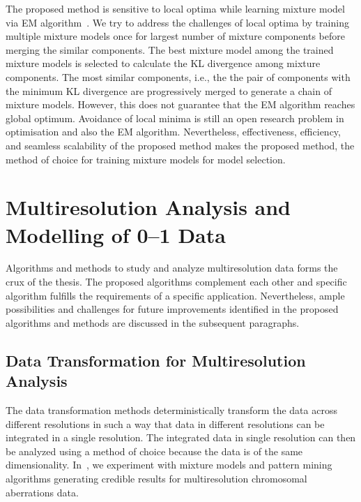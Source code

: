 The proposed method is sensitive to local optima while  learning 
mixture model via EM algorithm~\cite{McLachlan2008emext,wu1983}.
We try to address the challenges of local optima by training 
multiple mixture models once for largest number of mixture 
components before merging the similar components. The best 
mixture model among the trained mixture models is selected to 
calculate the KL divergence among mixture components. The most 
similar components, i.e., the the pair of components with the 
minimum KL divergence are progressively merged to generate a 
chain of mixture models. However, this does not guarantee that the 
EM algorithm reaches global optimum. Avoidance of local 
minima is still an open research problem in optimisation and
also the EM algorithm. Nevertheless, effectiveness, efficiency, 
and seamless scalability of the proposed method makes the 
proposed method, the method of choice for training mixture 
models for model selection.



\section{Multiresolution Analysis and Modelling of 0--1 Data}
\label{s:dmultires}

Algorithms and methods to study and analyze multiresolution
data forms the crux of the thesis. The proposed algorithms 
complement each other and specific algorithm fulfills the 
requirements of a specific application. Nevertheless, 
ample possibilities and challenges for future improvements 
identified in the proposed algorithms and methods are discussed
in the subsequent paragraphs.

\subsection{Data Transformation for Multiresolution Analysis}
\label{ss:dtatr4multiresmdl}

The data transformation methods deterministically transform 
the data across different resolutions in such a way that 
data in different resolutions can be integrated in a single 
resolution. The integrated data in single resolution can 
then be analyzed using a method of choice because the data 
is of the same dimensionality. In~, we experiment
with mixture models and pattern mining algorithms generating 
credible results for multiresolution chromosomal aberrations
data.

